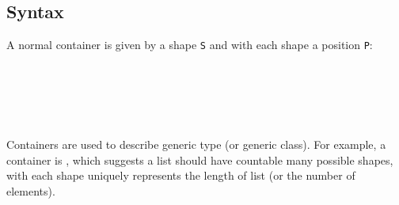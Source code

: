 \subsection{Syntax}

A normal container is given by a shape \texttt{S} and with each shape a position \texttt{P}:

\begin{code}%
\>[0]\AgdaSpace{}%
\AgdaSpace{}%
\AgdaSymbol{:}\AgdaSpace{}%
\AgdaSpace{}%
\<%
\\
\>[0][@{}l@{\AgdaIndent{0}}]%
\>[2]\AgdaSpace{}%
\<%
\\
%
\>[2]\<%
\\
\>[2][@{}l@{\AgdaIndent{0}}]%
\>[4]\AgdaSpace{}%
\AgdaSymbol{:}\AgdaSpace{}%
\<%
\\
%
\>[4]\AgdaSpace{}%
\AgdaSymbol{:}\AgdaSpace{}%
\AgdaSpace{}%
\AgdaSpace{}%
\<%
\end{code}

\begin{code}[hide]%
\>[0]\AgdaSpace{}%
\AgdaSpace{}%
\AgdaSpace{}%
\AgdaSymbol{:}\AgdaSpace{}%
\<%
\end{code}

Containers are used to describe generic type (or generic class). For example, a  container is   , which suggests a list should have countable many possible shapes, with each shape uniquely represents the length of list (or the number of elements).

